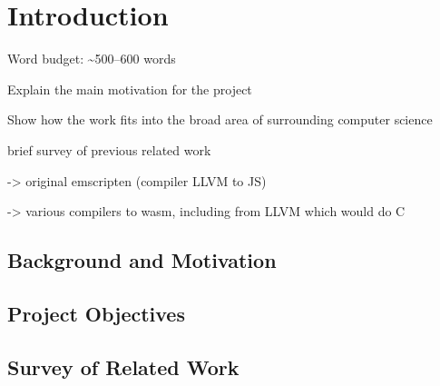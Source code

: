 \documentclass[00-main.tex]{subfiles}
\begin{document}
\chapter{Introduction}

\begin{Comment}
Word budget: \textasciitilde 500--600 words
\end{Comment}

\begin{Comment}
Explain the main motivation for the project

Show how the work fits into the broad area of surrounding computer science

brief survey of previous related work

-> original emscripten (compiler LLVM to JS)

-> various compilers to wasm, including from LLVM which would do C
\end{Comment}

\section{Background and Motivation}

\section{Project Objectives}

\section{Survey of Related Work}
\end{document}
